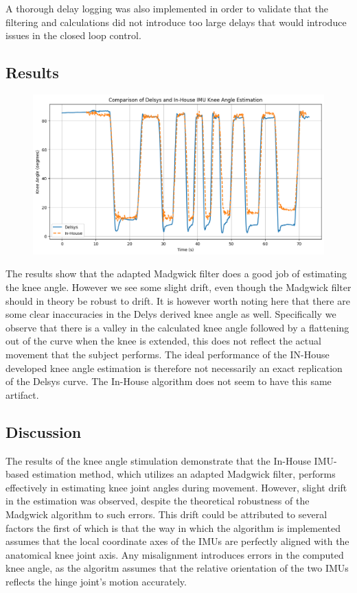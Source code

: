A thorough delay logging was also implemented in order to validate that the filtering and calculations did not introduce too large delays that would introduce issues in the closed loop control. 

\subsection{Results}
\begin{figure} [H]
    \centering
    \includegraphics[width=0.95\linewidth]{images/T11_betterplotting.png}
    \caption{}
    \label{fig:t11}
\end{figure}

The results show that the adapted Madgwick filter does a good job of estimating the knee angle. However we see some slight drift, even though the Madgwick filter should in theory be robust to drift. It is however worth noting here that there are some clear inaccuracies in the Delys derived knee angle as well. Specifically we observe that there is a valley in the calculated knee angle followed by a flattening out of the curve when the knee is extended, this does not reflect the actual movement that the subject performs. The ideal performance of the IN-House developed knee angle estimation is therefore not necessarily an exact replication of the Delsys curve. The In-House algorithm does not seem to have this same artifact.

\subsection{Discussion}
The results of the knee angle stimulation demonstrate that the In-House IMU-based estimation method, which utilizes an adapted Madgwick filter, performs effectively in estimating knee joint angles during movement. However, slight drift in the estimation was observed, despite the theoretical robustness of the Madgwick algorithm to such errors. This drift could be attributed to several factors the first of which is that the way in which the algorithm is implemented assumes that the local coordinate axes of the IMUs are perfectly aligned with the anatomical knee joint axis. Any misalignment introduces errors in the computed knee angle, as the algoritm assumes that the relative orientation of the two IMUs reflects the hinge joint's motion accurately.


